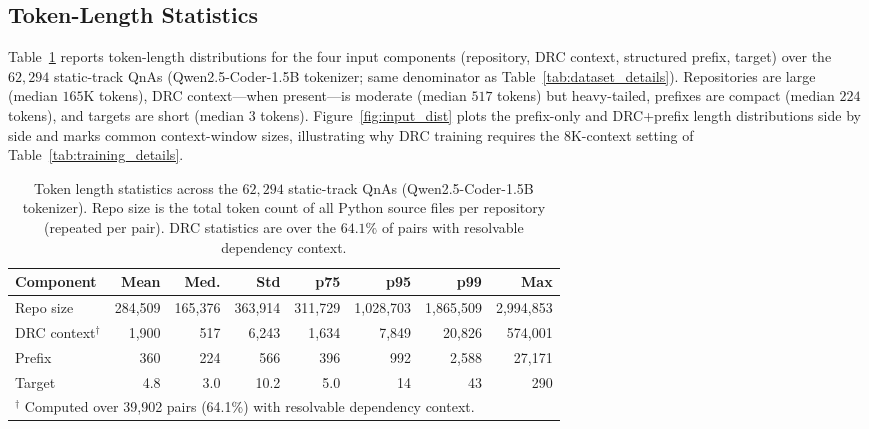 \documentclass[11pt]{article}
\begin{document}
\subsection{Token-Length Statistics}
\label{app:dataset:tokens}

Table~\ref{tab:token_stats} reports token-length distributions for the four input components (repository, DRC context, structured prefix, target) over the $62{,}294$ static-track QnAs (Qwen2.5-Coder-1.5B tokenizer; same denominator as Table~\ref{tab:dataset_details}).
Repositories are large (median $165$K tokens), DRC context---when present---is moderate (median $517$ tokens) but heavy-tailed, prefixes are compact (median $224$ tokens), and targets are short (median $3$ tokens).
Figure~\ref{fig:input_dist} plots the prefix-only and DRC+prefix length distributions side by side and marks common context-window sizes, illustrating why DRC training requires the 8K-context setting of Table~\ref{tab:training_details}.

\begin{table}[t]
\begin{small}
\begin{center}
\caption{Token length statistics across the $62{,}294$ static-track QnAs (Qwen2.5-Coder-1.5B tokenizer). Repo size is the total token count of all Python source files per repository (repeated per pair). DRC statistics are over the $64.1\%$ of pairs with resolvable dependency context.}\label{tab:token_stats}

\setlength{\tabcolsep}{6pt}
\renewcommand{\arraystretch}{1.1}
\begin{tabular}{lrrrrrrr}
\toprule
\textbf{Component} & \textbf{Mean} & \textbf{Med.} & \textbf{Std} & \textbf{p75} & \textbf{p95} & \textbf{p99} & \textbf{Max} \\
\midrule
Repo size       & 284{,}509 & 165{,}376 & 363{,}914 & 311{,}729 & 1{,}028{,}703 & 1{,}865{,}509 & 2{,}994{,}853 \\
DRC context$^\dag$ & 1{,}900 & 517 & 6{,}243 & 1{,}634 & 7{,}849 & 20{,}826 & 574{,}001 \\
Prefix          & 360 & 224 & 566 & 396 & 992 & 2{,}588 & 27{,}171 \\
Target          & 4.8 & 3.0 & 10.2 & 5.0 & 14 & 43 & 290 \\
\bottomrule
\multicolumn{8}{l}{\footnotesize $^\dag$ Computed over 39{,}902 pairs (64.1\%) with resolvable dependency context.}
\end{tabular}


\end{center}
\end{small}
\end{table}
\end{document}
